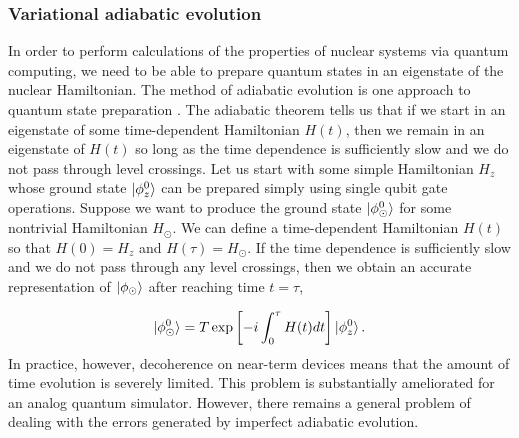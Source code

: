 \documentclass[10pt]{article}
\begin{document}
\subsubsection{Variational adiabatic evolution}

In order to perform calculations of the properties of nuclear systems
via quantum computing, we need to be able to prepare quantum states in
an eigenstate of the nuclear Hamiltonian. The method of adiabatic
evolution is one approach to quantum state preparation
\cite{Farhi:2000a}.  The adiabatic theorem tells us that if we start
in an eigenstate of some time-dependent Hamiltonian $H(t)$, then we
remain in an eigenstate of $H(t)$ so long as the time dependence is
sufficiently slow and we do not pass through level crossings.  Let us
start with some simple Hamiltonian $H_z$ whose ground state
$\ket{\phi^0_z}$ can be prepared simply using single qubit gate
operations. Suppose we want to produce the ground state
$\ket{\phi^{0}_\odot}$ for some nontrivial Hamiltonian $H_\odot$.  We
can define a time-dependent Hamiltonian $H(t)$ so that $H(0)=H_z$ and
$H(\tau)=H_\odot$.  If the time dependence is sufficiently slow and we
do not pass through any level crossings, then we obtain an accurate
representation of $\ket{\phi_\odot}$ after reaching time $t = \tau$,

\begin{equation}
\ket{\phi_\odot^0} = T \exp\left[-i\int_0^\tau H(t) dt \right]\ket{\phi_z^{0}}.
\end{equation}  
In practice, however, decoherence on near-term devices means that the
amount of time evolution is severely limited.  This problem is
substantially ameliorated for an analog quantum simulator.  However,
there remains a general problem of dealing with the errors generated
by imperfect adiabatic evolution.
\end{document}
